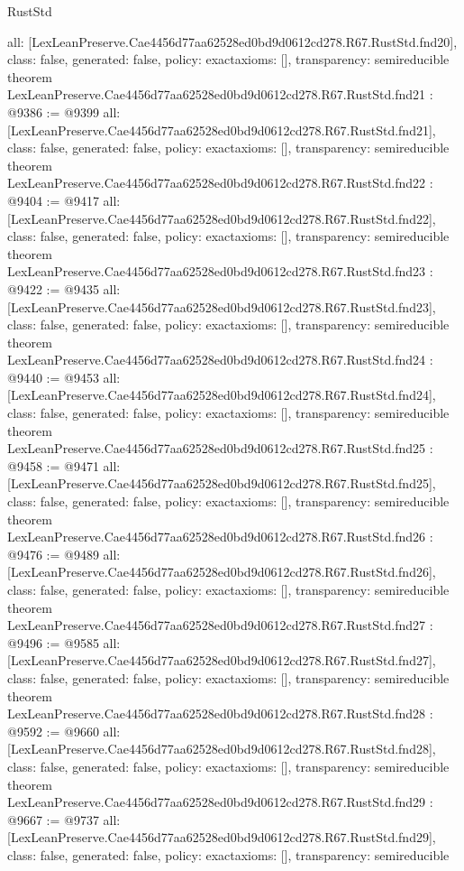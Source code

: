 \begin{lexlean}{RustStd}
\begin{coremodule}
{  all: [LexLeanPreserve.Cae4456d77aa62528ed0bd9d0612cd278.R67.RustStd.fnd20],
  class: false,
  generated: false,
  policy: exact{axioms: []},
  transparency: semireducible
}
theorem LexLeanPreserve.Cae4456d77aa62528ed0bd9d0612cd278.R67.RustStd.fnd21 : @9386 := @9399 {
  all: [LexLeanPreserve.Cae4456d77aa62528ed0bd9d0612cd278.R67.RustStd.fnd21],
  class: false,
  generated: false,
  policy: exact{axioms: []},
  transparency: semireducible
}
theorem LexLeanPreserve.Cae4456d77aa62528ed0bd9d0612cd278.R67.RustStd.fnd22 : @9404 := @9417 {
  all: [LexLeanPreserve.Cae4456d77aa62528ed0bd9d0612cd278.R67.RustStd.fnd22],
  class: false,
  generated: false,
  policy: exact{axioms: []},
  transparency: semireducible
}
theorem LexLeanPreserve.Cae4456d77aa62528ed0bd9d0612cd278.R67.RustStd.fnd23 : @9422 := @9435 {
  all: [LexLeanPreserve.Cae4456d77aa62528ed0bd9d0612cd278.R67.RustStd.fnd23],
  class: false,
  generated: false,
  policy: exact{axioms: []},
  transparency: semireducible
}
theorem LexLeanPreserve.Cae4456d77aa62528ed0bd9d0612cd278.R67.RustStd.fnd24 : @9440 := @9453 {
  all: [LexLeanPreserve.Cae4456d77aa62528ed0bd9d0612cd278.R67.RustStd.fnd24],
  class: false,
  generated: false,
  policy: exact{axioms: []},
  transparency: semireducible
}
theorem LexLeanPreserve.Cae4456d77aa62528ed0bd9d0612cd278.R67.RustStd.fnd25 : @9458 := @9471 {
  all: [LexLeanPreserve.Cae4456d77aa62528ed0bd9d0612cd278.R67.RustStd.fnd25],
  class: false,
  generated: false,
  policy: exact{axioms: []},
  transparency: semireducible
}
theorem LexLeanPreserve.Cae4456d77aa62528ed0bd9d0612cd278.R67.RustStd.fnd26 : @9476 := @9489 {
  all: [LexLeanPreserve.Cae4456d77aa62528ed0bd9d0612cd278.R67.RustStd.fnd26],
  class: false,
  generated: false,
  policy: exact{axioms: []},
  transparency: semireducible
}
theorem LexLeanPreserve.Cae4456d77aa62528ed0bd9d0612cd278.R67.RustStd.fnd27 : @9496 := @9585 {
  all: [LexLeanPreserve.Cae4456d77aa62528ed0bd9d0612cd278.R67.RustStd.fnd27],
  class: false,
  generated: false,
  policy: exact{axioms: []},
  transparency: semireducible
}
theorem LexLeanPreserve.Cae4456d77aa62528ed0bd9d0612cd278.R67.RustStd.fnd28 : @9592 := @9660 {
  all: [LexLeanPreserve.Cae4456d77aa62528ed0bd9d0612cd278.R67.RustStd.fnd28],
  class: false,
  generated: false,
  policy: exact{axioms: []},
  transparency: semireducible
}
theorem LexLeanPreserve.Cae4456d77aa62528ed0bd9d0612cd278.R67.RustStd.fnd29 : @9667 := @9737 {
  all: [LexLeanPreserve.Cae4456d77aa62528ed0bd9d0612cd278.R67.RustStd.fnd29],
  class: false,
  generated: false,
  policy: exact{axioms: []},
  transparency: semireducible
}
\end{coremodule}
\end{lexlean}
